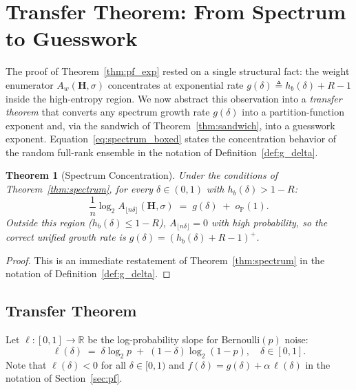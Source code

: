 \documentclass[journal,10pt,onecolumn]{IEEEtran}
\newtheorem{theorem}{Theorem}
\newcommand{\Pb}{\mathbb{P}}
\newcommand{\Hb}{h_b}
\newcommand{\Hm}{\mathbf{H}}
\begin{document}

\section{Transfer Theorem: From Spectrum to Guesswork}
\label{sec:transfer}

The proof of Theorem~\ref{thm:pf_exp} rested on a single structural
fact: the weight enumerator $A_w(\Hm,\sigma)$ concentrates at
exponential rate $g(\delta)\triangleq\Hb(\delta)+R-1$ inside the high-entropy
region.  We now abstract this observation into a \emph{transfer
theorem} that converts any spectrum growth rate $g(\delta)$ into a
partition-function exponent and, via the sandwich of
Theorem~\ref{thm:sandwich}, into a guesswork exponent.
Equation~\eqref{eq:spectrum_boxed} states the concentration behavior of the random full-rank ensemble in the notation of Definition~\ref{def:g_delta}.

\begin{theorem}[Spectrum Concentration]
\label{thm:spectrum_boxed}
Under the conditions of Theorem~\ref{thm:spectrum}, for every
$\delta\in(0,1)$ with $\Hb(\delta)>1-R$:
\begin{equation}
    \frac{1}{n}\log_2 A_{\lfloor n\delta\rfloor}(\Hm,\sigma)
    \;=\;
    g(\delta)\;+\;o_{\Pb}(1).
\label{eq:spectrum_boxed}
\end{equation}
Outside this region ($\Hb(\delta)\le 1-R$), $A_{\lfloor n\delta\rfloor}=0$
with high probability, so the correct unified growth rate is
$g(\delta)=(\Hb(\delta)+R-1)^+$.
\end{theorem}

\begin{proof}
This is an immediate restatement of Theorem~\ref{thm:spectrum}
in the notation of Definition~\ref{def:g_delta}.
\end{proof}

\subsection{Transfer Theorem}

Let $\ell:[0,1]\to\mathbb{R}$ be the log-probability slope for
Bernoulli$(p)$ noise:
\begin{equation}
    \ell(\delta)
    \;=\;
    \delta\log_2 p\;+\;(1-\delta)\log_2(1-p),
    \quad \delta\in[0,1].
    \label{eq:ell_def}
\end{equation}
Note that $\ell(\delta)<0$ for all $\delta\in[0,1)$ and
$f(\delta)=g(\delta)+\alpha\,\ell(\delta)$ in the notation of
Section~\ref{sec:pf}.
\end{document}
